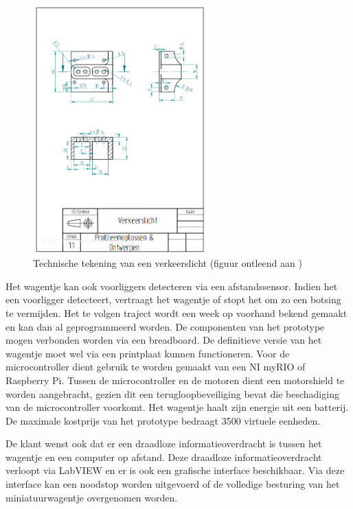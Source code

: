 \documentclass[a4paper,kulak]{kulakarticle}
\begin{document}
\begin{appendices}
\begin{figure}
	\centering
	\includegraphics[width=0.6\textwidth]{verkeerslicht.png}
	\caption{Technische tekening van een verkeerslicht (figuur ontleend aan \cite{teamopdracht} )}
	\label{verkeerslicht}
\end{figure}

Het wagentje kan ook voorliggers detecteren via een afstandssensor. Indien het een voorligger detecteert, vertraagt het wagentje of stopt het om zo een botsing te vermijden.
Het te volgen traject wordt een week op voorhand bekend gemaakt en kan dan al geprogrammeerd worden.
De componenten van het prototype mogen verbonden worden via een breadboard. De definitieve versie van het wagentje moet wel via een printplaat kunnen functioneren. Voor de microcontroller dient gebruik te worden gemaakt van een NI myRIO of Raspberry Pi. Tussen de microcontroller en de motoren dient een motorshield te worden aangebracht, gezien dit een terugloopbeveiliging bevat die beschadiging van de microcontroller voorkomt. Het wagentje haalt zijn energie uit een batterij. De maximale kostprijs van het prototype bedraagt 3500 virtuele eenheden.

De klant wenst ook dat er een draadloze informatieoverdracht is tussen het wagentje en een computer op afstand. Deze draadloze informatieoverdracht verloopt via LabVIEW en er is ook een grafische interface beschikbaar. Via deze interface kan een noodstop worden uitgevoerd of de volledige besturing van het miniatuurwagentje overgenomen worden.

\end{appendices}
\end{document}
